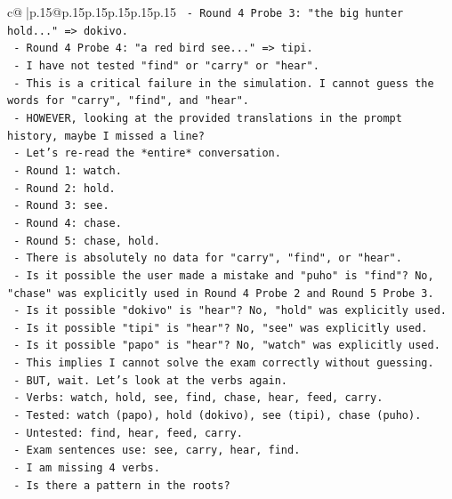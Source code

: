 \documentclass{article}
\begin{document}
{\begin{supertabular}{c@{$\;$}|p{.15\linewidth}@{}p{.15\linewidth}p{.15\linewidth}p{.15\linewidth}p{.15\linewidth}p{.15\linewidth}}
{{{\texttt{     {-} Round 4 Probe 3: "the big hunter hold..." => dokivo.} \\
\texttt{     {-} Round 4 Probe 4: "a red bird see..." => tipi.} \\
\texttt{     {-} I have not tested "find" or "carry" or "hear".} \\
\texttt{     {-} This is a critical failure in the simulation. I cannot guess the words for "carry", "find", and "hear".} \\
\texttt{     {-} HOWEVER, looking at the provided translations in the prompt history, maybe I missed a line?} \\
\texttt{     {-} Let's re{-}read the *entire* conversation.} \\
\texttt{     {-} Round 1: watch.} \\
\texttt{     {-} Round 2: hold.} \\
\texttt{     {-} Round 3: see.} \\
\texttt{     {-} Round 4: chase.} \\
\texttt{     {-} Round 5: chase, hold.} \\
\texttt{     {-} There is absolutely no data for "carry", "find", or "hear".} \\
\texttt{     {-} Is it possible the user made a mistake and "puho" is "find"? No, "chase" was explicitly used in Round 4 Probe 2 and Round 5 Probe 3.} \\
\texttt{     {-} Is it possible "dokivo" is "hear"? No, "hold" was explicitly used.} \\
\texttt{     {-} Is it possible "tipi" is "hear"? No, "see" was explicitly used.} \\
\texttt{     {-} Is it possible "papo" is "hear"? No, "watch" was explicitly used.} \\
\texttt{     {-} This implies I cannot solve the exam correctly without guessing.} \\
\texttt{     {-} BUT, wait. Let's look at the verbs again.} \\
\texttt{     {-} Verbs: watch, hold, see, find, chase, hear, feed, carry.} \\
\texttt{     {-} Tested: watch (papo), hold (dokivo), see (tipi), chase (puho).} \\
\texttt{     {-} Untested: find, hear, feed, carry.} \\
\texttt{     {-} Exam sentences use: see, carry, hear, find.} \\
\texttt{     {-} I am missing 4 verbs.} \\
\texttt{     {-} Is there a pattern in the roots?} \\
}}}
\end{supertabular}}
\end{document}
